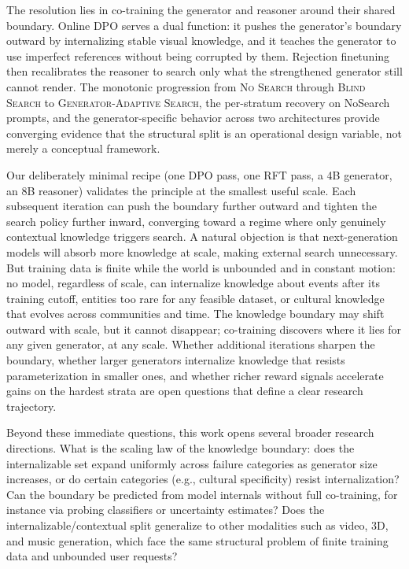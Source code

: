 \documentclass{article}
\newcommand{\CondNS}{\textsc{No Search}}
\newcommand{\CondGS}{\textsc{Blind Search}}
\newcommand{\CondGAS}{\textsc{Generator-Adaptive Search}}
\begin{document}
The resolution lies in co-training the generator and reasoner around their shared boundary. Online DPO serves a dual function: it pushes the generator's boundary outward by internalizing stable visual knowledge, and it teaches the generator to use imperfect references without being corrupted by them. Rejection finetuning then recalibrates the reasoner to search only what the strengthened generator still cannot render. The monotonic progression from \CondNS{} through \CondGS{} to \CondGAS{}, the per-stratum recovery on NoSearch prompts, and the generator-specific behavior across two architectures provide converging evidence that the structural split is an operational design variable, not merely a conceptual framework.

Our deliberately minimal recipe (one DPO pass, one RFT pass, a 4B generator, an 8B reasoner) validates the principle at the smallest useful scale. Each subsequent iteration can push the boundary further outward and tighten the search policy further inward, converging toward a regime where only genuinely contextual knowledge triggers search. A natural objection is that next-generation models will absorb more knowledge at scale, making external search unnecessary. But training data is finite while the world is unbounded and in constant motion: no model, regardless of scale, can internalize knowledge about events after its training cutoff, entities too rare for any feasible dataset, or cultural knowledge that evolves across communities and time. The knowledge boundary may shift outward with scale, but it cannot disappear; co-training discovers where it lies for any given generator, at any scale. Whether additional iterations sharpen the boundary, whether larger generators internalize knowledge that resists parameterization in smaller ones, and whether richer reward signals accelerate gains on the hardest strata are open questions that define a clear research trajectory.

Beyond these immediate questions, this work opens several broader research directions. What is the scaling law of the knowledge boundary: does the internalizable set expand uniformly across failure categories as generator size increases, or do certain categories (e.g., cultural specificity) resist internalization? Can the boundary be predicted from model internals without full co-training, for instance via probing classifiers or uncertainty estimates? Does the internalizable/contextual split generalize to other modalities such as video, 3D, and music generation, which face the same structural problem of finite training data and unbounded user requests?
\end{document}
